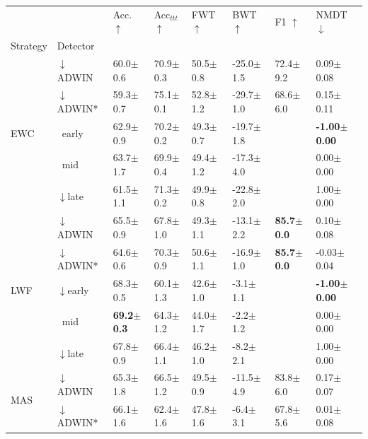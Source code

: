 \begin{tabular}{llllllll}
\toprule
 &  & Acc. $\uparrow$ & Acc$_{ttt}$ $\uparrow$ & FWT $\uparrow$ & BWT $\uparrow$ & F1 $\uparrow$ & NMDT $\downarrow$ \\
Strategy & Detector &  &  &  &  &  &  \\
\midrule
\multirow[t]{5}{*}{EWC} & $\downarrow$ADWIN & 60.0\tiny{$\pm$0.6} & 70.9\tiny{$\pm$0.3} & 50.5\tiny{$\pm$0.8} & -25.0\tiny{$\pm$1.5} & 72.4\tiny{$\pm$9.2} & 0.09\tiny{$\pm$0.08} \\
 & $\downarrow$ADWIN* & 59.3\tiny{$\pm$0.7} & 75.1\tiny{$\pm$0.1} & 52.8\tiny{$\pm$1.2} & -29.7\tiny{$\pm$1.0} & 68.6\tiny{$\pm$6.0} & 0.15\tiny{$\pm$0.11} \\
 & $\ \;$early & 62.9\tiny{$\pm$0.9} & 70.2\tiny{$\pm$0.2} & 49.3\tiny{$\pm$0.7} & -19.7\tiny{$\pm$1.8} &  & \textbf{-1.00\tiny{$\pm$0.00}} \\
 & $\ \;$mid & 63.7\tiny{$\pm$1.7} & 69.9\tiny{$\pm$0.4} & 49.4\tiny{$\pm$1.2} & -17.3\tiny{$\pm$4.0} &  & 0.00\tiny{$\pm$0.00} \\
 & $\downarrow$late & 61.5\tiny{$\pm$1.1} & 71.3\tiny{$\pm$0.2} & 49.9\tiny{$\pm$0.8} & -22.8\tiny{$\pm$2.0} &  & 1.00\tiny{$\pm$0.00} \\
\midrule
\multirow[t]{5}{*}{LWF} & $\downarrow$ADWIN & 65.5\tiny{$\pm$0.9} & 67.8\tiny{$\pm$1.0} & 49.3\tiny{$\pm$1.1} & -13.1\tiny{$\pm$2.2} & \textbf{85.7\tiny{$\pm$0.0}} & 0.10\tiny{$\pm$0.08} \\
 & $\downarrow$ADWIN* & 64.6\tiny{$\pm$0.6} & 70.3\tiny{$\pm$0.9} & 50.6\tiny{$\pm$1.1} & -16.9\tiny{$\pm$1.0} & \textbf{85.7\tiny{$\pm$0.0}} & -0.03\tiny{$\pm$0.04} \\
 & $\downarrow$early & 68.3\tiny{$\pm$0.5} & 60.1\tiny{$\pm$1.3} & 42.6\tiny{$\pm$1.0} & -3.1\tiny{$\pm$1.1} &  & \textbf{-1.00\tiny{$\pm$0.00}} \\
 & $\ \;$mid & \textbf{69.2\tiny{$\pm$0.3}} & 64.3\tiny{$\pm$1.2} & 44.0\tiny{$\pm$1.7} & -2.2\tiny{$\pm$1.2} &  & 0.00\tiny{$\pm$0.00} \\
 & $\downarrow$late & 67.8\tiny{$\pm$0.9} & 66.4\tiny{$\pm$1.1} & 46.2\tiny{$\pm$1.0} & -8.2\tiny{$\pm$2.1} &  & 1.00\tiny{$\pm$0.00} \\
\midrule
\multirow[t]{5}{*}{MAS} & $\downarrow$ADWIN & 65.3\tiny{$\pm$1.8} & 66.5\tiny{$\pm$1.2} & 49.5\tiny{$\pm$0.9} & -11.5\tiny{$\pm$4.9} & 83.8\tiny{$\pm$6.0} & 0.17\tiny{$\pm$0.07} \\
 & $\downarrow$ADWIN* & 66.1\tiny{$\pm$1.6} & 62.4\tiny{$\pm$1.6} & 47.8\tiny{$\pm$1.6} & -6.4\tiny{$\pm$3.1} & 67.8\tiny{$\pm$5.6} & 0.01\tiny{$\pm$0.08} \\

\end{tabular}
